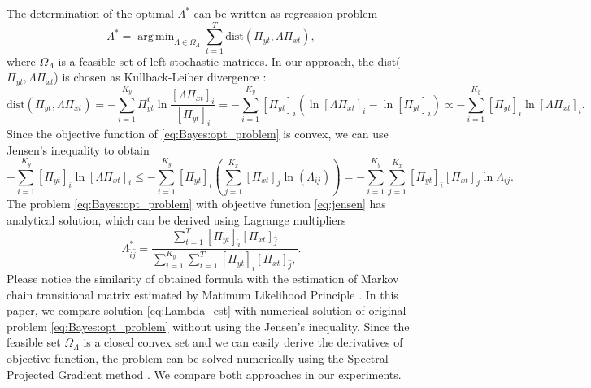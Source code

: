 \documentclass{aip-cp}
\DeclareMathOperator*{\argmin}{arg\,min}
\begin{document}
The determination of the optimal $\Lambda^{*}$ can be written as regression problem
\begin{equation}
    \Lambda^* = \argmin_{\Lambda \in \Omega_{\Lambda}} \sum_{t=1}^{T} \text{dist}(\Pi_{yt}, \Lambda\Pi_{xt}),
    \label{eq:Bayes:opt_problem}
\end{equation}
where $\Omega_{\Lambda}$ is a feasible set of left stochastic matrices. In our approach, the dist($\Pi_{yt}, \Lambda\Pi_{xt}$) is chosen as Kullback-Leiber divergence \cite{Kullback1951}:
\begin{equation}
    \text{dist}(\Pi_{yt}, \Lambda\Pi_{xt}) = - \sum_{i=1}^{K_y} \Pi_{yt}^i \ln\frac{[\Lambda\Pi_{xt}]_i}{[\Pi_{yt}]_i} = - \sum_{i=1}^{K_y} [\Pi_{yt}]_i (\ln [\Lambda\Pi_{xt}]_i - \ln [\Pi_{yt}]_i)
    \propto - \sum_{i=1}^{K_y} [\Pi_{yt}]_i \ln [\Lambda\Pi_{xt}]_i.
\end{equation}
Since the objective function of \eqref{eq:Bayes:opt_problem} is convex, we can use Jensen's inequality to obtain
\begin{equation}
\label{eq:jensen}
    - \sum_{i=1}^{K_y} [\Pi_{yt}]_i \ln [\Lambda\Pi_{xt}]_i \leq - \sum_{i=1}^{K_y} [\Pi_{yt}]_i ( \sum_{j=1}^{K_x} [\Pi_{xt}]_j \ln (\Lambda_{ij}) ) = - \sum_{i=1}^{K_y} \sum_{j=1}^{K_x} [\Pi_{yt}]_i [\Pi_{xt}]_j \ln \Lambda_{ij}.
\end{equation}
The problem \eqref{eq:Bayes:opt_problem} with objective function \eqref{eq:jensen} has analytical solution, which can be derived using Lagrange multipliers
\begin{equation}
\label{eq:Lambda_est}
    \Lambda_{\hat{i}\hat{j}}^{*} = \frac{\sum_{t=1}^{T} [\Pi_{yt}]_{\hat{i}} [\Pi_{xt}]_{\hat{j}}}{\sum_{i=1}^{K_y} \sum_{t=1}^{T} [\Pi_{yt}]_{i} [\Pi_{xt}]_{\hat{j}},}.
\end{equation}
Please notice the similarity of obtained formula with the estimation of Markov chain transitional matrix estimated by Matimum Likelihood Principle \cite{NorBOOK-1998}.
In this paper, we compare solution \eqref{eq:Lambda_est} with numerical solution of original problem \eqref{eq:Bayes:opt_problem} without using the Jensen's inequality. Since the feasible set $\Omega_{\Lambda}$ is a closed convex set and we can easily derive the derivatives of objective function, the problem can be solved numerically using the Spectral Projected Gradient method \cite{birgin2000}. We compare both approaches in our experiments.
\end{document}
